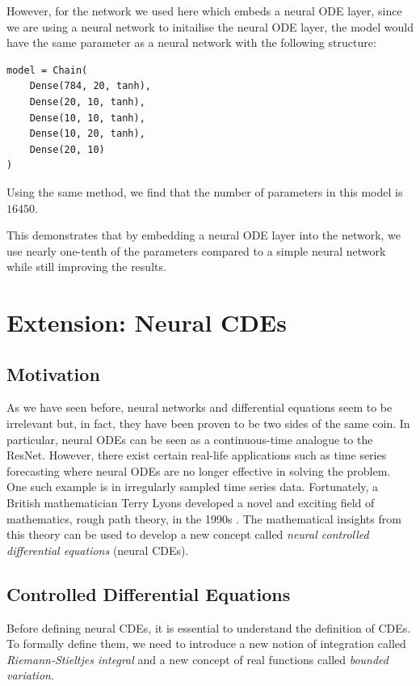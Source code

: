 \documentclass[a4paper,11pt,titlepage]{article}
\theoremstyle{definition}
\theoremstyle{plain}
\theoremstyle{remark}
\begin{document}
However, for the network we used here which embeds a neural ODE layer, since we are using a neural network to initailise the neural ODE layer, the model would have the same parameter as a neural network with the following structure:
\begin{verbatim}
model = Chain(
    Dense(784, 20, tanh),
    Dense(20, 10, tanh),
    Dense(10, 10, tanh),
    Dense(10, 20, tanh),
    Dense(20, 10)
)
\end{verbatim}

Using the same method, we find that the number of parameters in this model is $16450$.

This demonstrates that by embedding a neural ODE layer into the network, we use nearly one-tenth of the parameters compared to a simple neural network while still improving the results.

\pagebreak
\section{Extension: Neural CDEs}
\label{sec:extension}

\subsection{Motivation}

As we have seen before, neural networks and differential equations seem to be irrelevant but, in fact, they have been proven to be two sides of the same coin. In particular, neural ODEs can be seen as a continuous-time analogue to the ResNet. However, there exist certain real-life applications such as time series forecasting where neural ODEs are no longer effective in solving the problem. One such example is in irregularly sampled time series data. Fortunately, a British mathematician Terry Lyons developed a novel and exciting field of mathematics, rough path theory, in the 1990s \cite{kidger2022neural}. The mathematical insights from this theory can be used to develop a new concept called \textit{neural controlled differential equations} (neural CDEs).

\subsection{Controlled Differential Equations}

Before defining neural CDEs, it is essential to understand the definition of CDEs. To formally define them, we need to introduce a new notion of integration called \textit{Riemann-Stieltjes integral} and a new concept of real functions called \textit{bounded variation}.
\end{document}
